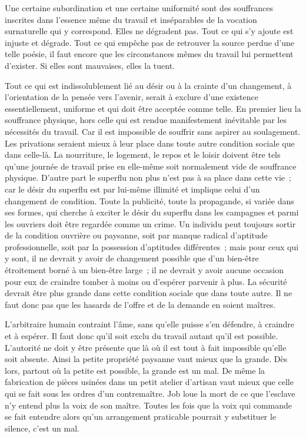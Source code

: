 \documentclass[french,twoside]{book} %
\begin{document}
Une certaine subordination et une certaine uniformité sont des souffrances inscrites dans l'essence même du travail et inséparables de la vocation surnaturelle qui y correspond. Elles ne dégradent pas. Tout ce qui s'y ajoute est injuste et dégrade. Tout ce qui empêche pas de retrouver la source perdue d'une telle poésie, il faut encore que les circonstances mêmes du travail lui permettent d'exister. Si elles sont mauvaises, elles la tuent.\par
Tout ce qui est indissolublement lié au désir ou à la crainte d'un changement, à l'orientation de la pensée vers l'avenir, serait à exclure d'une existence essentiellement, uniforme et qui doit être acceptée comme telle. En premier lieu la souffrance physique, hors celle qui est rendue manifestement inévitable par les nécessités du travail. Car il est impossible de souffrir sans aspirer au soulagement. Les privations seraient mieux à leur place dans toute autre condition sociale que dans celle-là. La nourriture, le logement, le repos et le loisir doivent être tels qu'une journée de travail prise en elle-même soit normalement vide de souffrance physique. D'autre part le superflu non plus n'est pas à sa place dans cette vie ; car le désir du superflu est par lui-même illimité et implique celui d'un changement de condition. Toute la publicité, toute la propagande, si variée dans ses formes, qui cherche à exciter le désir du superflu dans les campagnes et parmi les ouvriers doit être regardée comme un crime. Un individu peut toujours sortir de la condition ouvrière ou paysanne, soit par manque radical d'aptitude professionnelle, soit par la possession d'aptitudes différentes ; mais pour ceux qui y sont, il ne devrait y avoir de changement possible que d'un bien-être étroitement borné à un bien-être large ; il ne devrait y avoir aucune occasion pour eux de craindre tomber à moins ou d'espérer parvenir à plus. La sécurité devrait être plus grande dans cette condition sociale que dans toute autre. Il ne faut donc pas que les hasards de l'offre et de la demande en soient maîtres.\par
L'arbitraire humain contraint l'âme, sans qu'elle puisse s'en défendre, à craindre et à espérer. Il faut donc qu'il soit exclu du travail autant qu'il est possible. L'autorité ne doit y être présente que là où il est tout à fait impossible qu'elle soit absente. Ainsi la petite propriété paysanne vaut mieux que la grande. Dès lors, partout où la petite est possible, la grande est un mal. De même la fabrication de pièces usinées dans un petit atelier d'artisan vaut mieux que celle qui se fait sous les ordres d'un contremaître. Job loue la mort de ce que l'esclave n'y entend plus la voix de son maître. Toutes les fois que la voix qui commande se fait entendre alors qu'un arrangement praticable pourrait y substituer le silence, c'est un mal.\par
\end{document}
